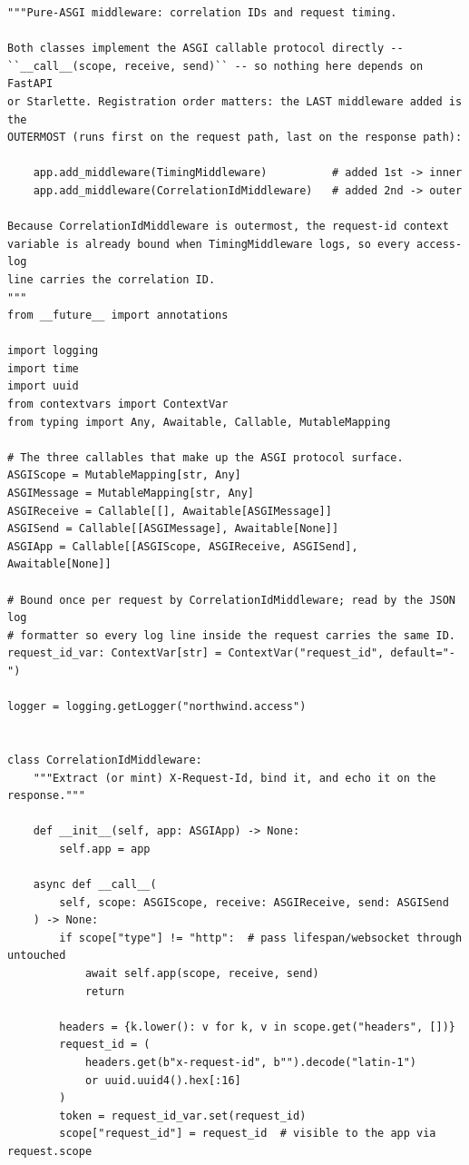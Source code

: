 \begin{verbatim}
"""Pure-ASGI middleware: correlation IDs and request timing.

Both classes implement the ASGI callable protocol directly --
``__call__(scope, receive, send)`` -- so nothing here depends on FastAPI
or Starlette. Registration order matters: the LAST middleware added is the
OUTERMOST (runs first on the request path, last on the response path):

    app.add_middleware(TimingMiddleware)          # added 1st -> inner
    app.add_middleware(CorrelationIdMiddleware)   # added 2nd -> outer

Because CorrelationIdMiddleware is outermost, the request-id context
variable is already bound when TimingMiddleware logs, so every access-log
line carries the correlation ID.
"""
from __future__ import annotations

import logging
import time
import uuid
from contextvars import ContextVar
from typing import Any, Awaitable, Callable, MutableMapping

# The three callables that make up the ASGI protocol surface.
ASGIScope = MutableMapping[str, Any]
ASGIMessage = MutableMapping[str, Any]
ASGIReceive = Callable[[], Awaitable[ASGIMessage]]
ASGISend = Callable[[ASGIMessage], Awaitable[None]]
ASGIApp = Callable[[ASGIScope, ASGIReceive, ASGISend], Awaitable[None]]

# Bound once per request by CorrelationIdMiddleware; read by the JSON log
# formatter so every log line inside the request carries the same ID.
request_id_var: ContextVar[str] = ContextVar("request_id", default="-")

logger = logging.getLogger("northwind.access")


class CorrelationIdMiddleware:
    """Extract (or mint) X-Request-Id, bind it, and echo it on the response."""

    def __init__(self, app: ASGIApp) -> None:
        self.app = app

    async def __call__(
        self, scope: ASGIScope, receive: ASGIReceive, send: ASGISend
    ) -> None:
        if scope["type"] != "http":  # pass lifespan/websocket through untouched
            await self.app(scope, receive, send)
            return

        headers = {k.lower(): v for k, v in scope.get("headers", [])}
        request_id = (
            headers.get(b"x-request-id", b"").decode("latin-1")
            or uuid.uuid4().hex[:16]
        )
        token = request_id_var.set(request_id)
        scope["request_id"] = request_id  # visible to the app via request.scope


\end{verbatim}
